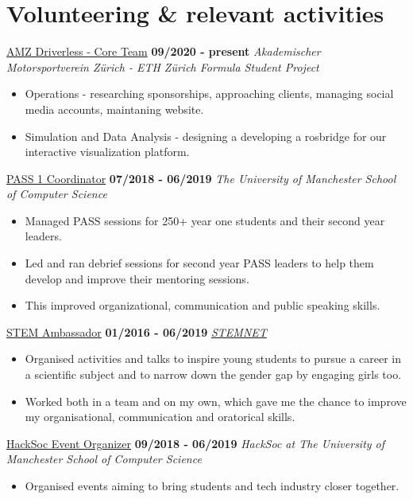 \documentclass[]{friggeri-cv}
\begin{document}
\section{\color{red}Volunteering \color{gray} \& relevant activities}
\entry
    {}
    {\href{https://driverless.amzracing.ch}{AMZ Driverless - Core Team}}
    {\textbf{09/2020 - present}}
    {\emph{Akademischer Motorsportverein Zürich - ETH Zürich Formula Student Project}}
    \begin{itemize}
        \item Operations - researching sponsorships, approaching clients, managing social media accounts, maintaning website.
        \item Simulation and Data Analysis - designing a developing a rosbridge for our interactive visualization platform.
    \end{itemize}
\entry
    {}
    {\href{http://www.pass.manchester.ac.uk/}{PASS 1 Coordinator}}
    {\textbf{07/2018 - 06/2019}}
    {\emph{The University of Manchester School of Computer Science}}
    \begin{itemize}
        \item Managed PASS sessions for 250+ year one students and their second year leaders.
        \item Led and ran debrief sessions for second year PASS leaders to help them develop and improve their mentoring sessions.
        \item This improved organizational, communication and public speaking skills.\\
    \end{itemize}
\entry
    {}
    {\href{http://www.stemnet.org.uk/ambassadors/}{STEM Ambassador}}
    {\textbf{01/2016 - 06/2019}}
    {\emph{\href{http://www.stemnet.org.uk/}{STEMNET}}}
    \begin{itemize}
        \item Organised activities and talks to inspire young students to pursue a career in a scientific subject and to narrow down the gender gap by engaging girls too.
        \item Worked both in a team and on my own, which gave me the chance to improve my organisational, communication and oratorical skills.\\
    \end{itemize}
\entry
    {}
    {\href{https://www.hacksoc.com}{HackSoc Event Organizer}}
    {\textbf{09/2018 - 06/2019}}
    {\emph{HackSoc at The University of Manchester School of Computer Science}}
    \begin{itemize}
        \item Organised events aiming to bring students and tech industry closer together.\\
    \end{itemize}
\end{document}

